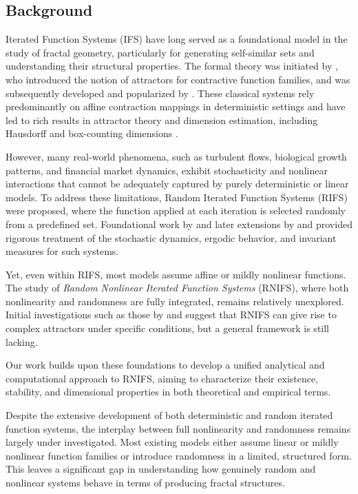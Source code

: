 \documentclass[twocolumn,10pt]{article}
\begin{document}
\subsection{Background}
\label{subsec:background}

Iterated Function Systems (IFS) have long served as a foundational model in the study of fractal geometry, particularly for generating self-similar sets and understanding their structural properties. The formal theory was initiated by  \parencite{hutchinson1981fractals}, who introduced the notion of attractors for contractive function families, and was subsequently developed and popularized by \parencite{barnsley1988fractals}. These classical systems rely predominantly on affine contraction mappings in deterministic settings and have led to rich results in attractor theory and dimension estimation, including Hausdorff and box-counting dimensions \parencite{schwarzenberger1990fractal,falconer2013fractal}.

However, many real-world phenomena, such as turbulent flows, biological growth patterns, and financial market dynamics, exhibit stochasticity and nonlinear interactions that cannot be adequately captured by purely deterministic or linear models. To address these limitations, Random Iterated Function Systems (RIFS) were proposed, where the function applied at each iteration is selected randomly from a predefined set. Foundational work by \parencite{diaconis1999iterated} and later extensions by  \parencite{diaconis1999iterated,walters1989yuri} and  \parencite{arnold1995random} provided rigorous treatment of the stochastic dynamics, ergodic behavior, and invariant measures for such systems.

Yet, even within RIFS, most models assume affine or mildly nonlinear functions. The study of \emph{Random Nonlinear Iterated Function Systems} (RNIFS), where both nonlinearity and randomness are fully integrated, remains relatively unexplored. Initial investigations such as those by  \parencite{iosifescu2009iterated,ghosh2022iterated} and  \parencite{kendall2017random} suggest that RNIFS can give rise to complex attractors under specific conditions, but a general framework is still lacking.

Our work builds upon these foundations to develop a unified analytical and computational approach to RNIFS, aiming to characterize their existence, stability, and dimensional properties in both theoretical and empirical terms.

Despite the extensive development of both deterministic and random iterated function systems, the interplay between full nonlinearity and randomness remains largely under investigated. Most existing models either assume linear or mildly nonlinear function families or introduce randomness in a limited, structured form. This leaves a significant gap in understanding how genuinely random and nonlinear systems behave in terms of producing fractal structures.
\end{document}
